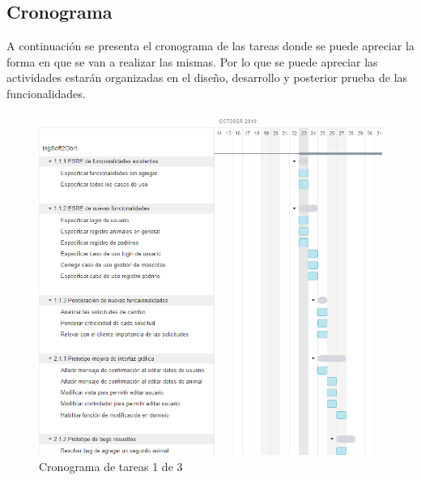 \subsection{Cronograma}

A continuación se presenta el cronograma de las tareas donde se puede apreciar la forma en que se van a realizar las mismas. Por lo que se puede apreciar las actividades estarán organizadas en el diseño, desarrollo y posterior prueba de las funcionalidades.

\begin{figure}[H]
    \centering
    \includegraphics[scale=0.5]{Files/gannt1.png}
    \caption{Cronograma de tareas 1 de 3}
    \label{fig:clases}
\end{figure}


